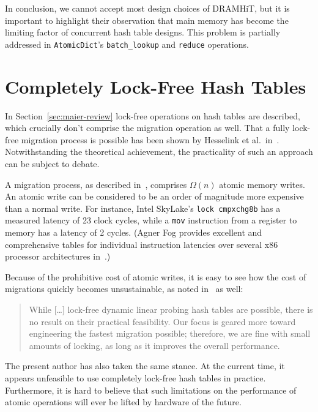 In conclusion, we cannot accept most design choices of DRAMHiT, but it is important to highlight their observation that main memory has become the limiting factor of concurrent hash table designs.
This problem is partially addressed in \texttt{AtomicDict}'s \texttt{{batch\_lookup}} and \texttt{reduce} operations.


\section{Completely Lock-Free Hash Tables}\label{sec:on-the-feasibility-of-completely-lock-free-hash-tables}

In Section~\ref{sec:maier-review} lock-free operations on hash tables are described, which crucially don't comprise the migration operation as well.
That a fully lock-free migration process is possible has been shown by Hesselink et al.\ in~\cite[\S3.5]{hesselink}.
Notwithstanding the theoretical achievement, the practicality of such an approach can be subject to debate.

A migration process, as described in~\cite{hesselink}, comprises $\Omega(n)$ atomic memory writes.
An atomic write can be considered to be an order of magnitude more expensive than a normal write.
For instance, Intel SkyLake's \texttt{lock~cmpxchg8b} has a measured latency of 23 clock cycles, while a \texttt{mov} instruction from a register to memory has a latency of 2 cycles.
(Agner Fog provides excellent and comprehensive tables for individual instruction latencies over several x86 processor architectures in~\cite{x86-instruction-tables}.)

Because of the prohibitive cost of atomic writes, it is easy to see how the cost of migrations quickly becomes unsustainable, as noted in~\cite{maier} as well:
\begin{quote}
	While [\ldots] lock-free dynamic linear probing hash tables are possible, there is no result on their practical feasibility.
	Our focus is geared more toward engineering the fastest migration possible; therefore, we are fine with small amounts of locking, as long as it improves the overall performance.
\end{quote}

The present author has also taken the same stance.
At the current time, it appears unfeasible to use completely lock-free hash tables in practice.
Furthermore, it is hard to believe that such limitations on the performance of atomic operations will ever be lifted by hardware of the future.

